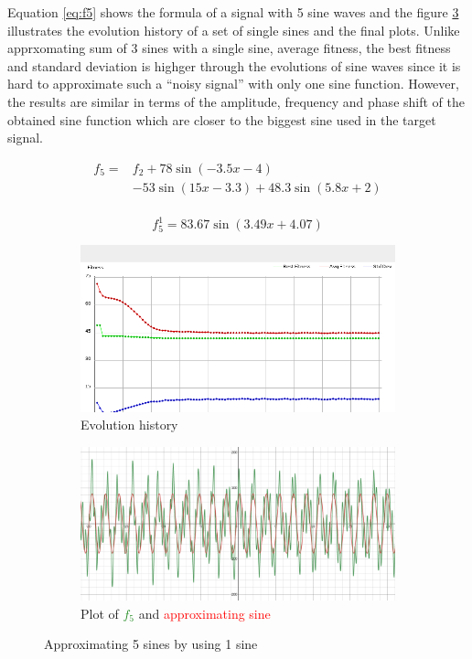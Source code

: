 \documentclass[conference]{IEEEtran}
\begin{document}
Equation \ref{eq:f5} shows the formula of a signal with 5 sine waves and the figure \ref{fig:sin5_1} illustrates the evolution history of a set of single sines and the final plots. Unlike apprxomating 
sum of 3 sines with a single sine, average fitness, the best fitness and standard deviation is highger through the evolutions of sine waves since it is hard to approximate such a ``noisy signal'' with 
only one sine function. However, the results are similar in terms of the amplitude, frequency and phase shift of the obtained sine function which are closer to the biggest sine used in the target signal.

\begin{equation}
	\begin{split}
		f_5 =& f_2 + 78\sin(-3.5x-4) \\
		&- 53\sin(15x-3.3) + 48.3\sin(5.8x+2) \\
	\end{split}
	\label{eq:f5}
\end{equation}

\begin{equation}
	f_5^1 = 83.67\sin(3.49x+4.07)
	\label{eq:f5_1}
\end{equation}

\begin{figure}[h]
\begin{subfigure}{.8\linewidth}
  \centering
  \includegraphics[width=.9\linewidth]{img/sin5_1_new.png}
  \caption{Evolution history}
  \label{fig:hist_sin5_1}
\end{subfigure}

\begin{subfigure}{.8\linewidth}
  \centering
  \includegraphics[width=.9\linewidth]{img/plot_sin5_1_new.png}
  \caption{Plot of \textcolor{ForestGreen}{$f_5$} and \textcolor{red}{approximating sine}}
  \label{fig:plot_sin5_1}
\end{subfigure}
\caption{Approximating 5 sines by using 1 sine}
\label{fig:sin5_1}
\end{figure}
\end{document}
